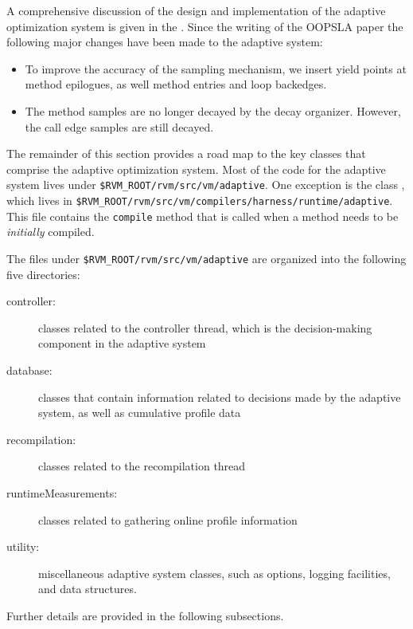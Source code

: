 A comprehensive discussion of the design and implementation of the
adaptive optimization system is given in the
.  
Since the writing of the OOPSLA paper the following major changes
have been made to the adaptive system:
\begin{itemize}
\item To improve the accuracy of the sampling mechanism, we insert
yield points at method epilogues, as well method entries and loop
backedges. 

\item The method samples are no longer decayed by the decay
organizer.  However, the call edge samples are still decayed.

\end{itemize}

The remainder of this section provides a road map to the key
classes that comprise the adaptive optimization system.
Most of the code for the adaptive system lives under
{\tt \$RVM\_ROOT/rvm/src/vm/adaptive}.   One exception is the class
, which lives in
{\tt \$RVM\_ROOT/\-rvm/\-src/\-vm/\-compilers/harness/runtime/adaptive}.  
This file contains the {\tt compile} method that is called when a
method needs to be {\em initially\/} compiled.  

The files under {\tt \$RVM\_ROOT/rvm/src/vm/adaptive} are organized
into the following five directories:
\begin{description}
\item[controller:] classes related to the controller thread, which is
the decision-making component in the adaptive system

\item[database:] classes that contain information related to decisions
made by the adaptive system, as well as cumulative profile data

\item[recompilation:]  classes related to the recompilation thread

\item[runtimeMeasurements:] classes related to gathering online
profile information

\item[utility:]  miscellaneous adaptive system classes, such as
options, logging facilities, and data structures.
\end{description}
Further details are provided in the following subsections.

